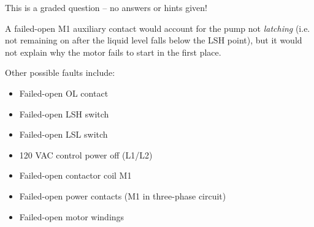 
This is a graded question -- no answers or hints given!







A failed-open M1 auxiliary contact would account for the pump not {\it latching} (i.e. not remaining on after the liquid level falls below the LSH point), but it would not explain why the motor fails to start in the first place.

\vskip 10pt

Other possible faults include:

\begin{itemize}
\item{} Failed-open OL contact
\item{} Failed-open LSH switch
\item{} Failed-open LSL switch
\item{} 120 VAC control power off (L1/L2)
\item{} Failed-open contactor coil M1
\item{} Failed-open power contacts (M1 in three-phase circuit)
\item{} Failed-open motor windings
\end{itemize}




